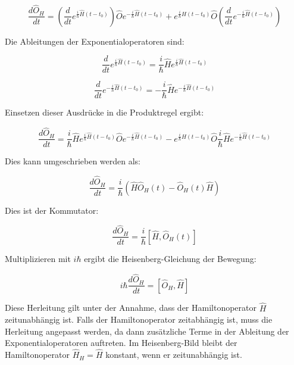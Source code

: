 \documentclass[11pt,a4paper]{article}
\begin{document}
\[
\frac{d \hat{O}_H}{d t} = \left( \frac{d}{d t} e^{\frac{i}{\hbar} \hat{H}(t-t_0)} \right) \hat{O} e^{-\frac{i}{\hbar} \hat{H}(t-t_0)} + e^{\frac{i}{\hbar} \hat{H}(t-t_0)} \hat{O} \left( \frac{d}{d t} e^{-\frac{i}{\hbar} \hat{H}(t-t_0)} \right)
\]

Die Ableitungen der Exponentialoperatoren sind:

\[
\frac{d}{d t} e^{\frac{i}{\hbar} \hat{H}(t-t_0)} = \frac{i}{\hbar} \hat{H} e^{\frac{i}{\hbar} \hat{H}(t-t_0)}
\]

\[
\frac{d}{d t} e^{-\frac{i}{\hbar} \hat{H}(t-t_0)} = -\frac{i}{\hbar} \hat{H} e^{-\frac{i}{\hbar} \hat{H}(t-t_0)}
\]

Einsetzen dieser Ausdrücke in die Produktregel ergibt:

\[
\frac{d \hat{O}_H}{d t} = \frac{i}{\hbar} \hat{H} e^{\frac{i}{\hbar} \hat{H}(t-t_0)} \hat{O} e^{-\frac{i}{\hbar} \hat{H}(t-t_0)} - e^{\frac{i}{\hbar} \hat{H}(t-t_0)} \hat{O} \frac{i}{\hbar} \hat{H} e^{-\frac{i}{\hbar} \hat{H}(t-t_0)}
\]

Dies kann umgeschrieben werden als:

\[
\frac{d \hat{O}_H}{d t} = \frac{i}{\hbar} \left( \hat{H} \hat{O}_H(t) - \hat{O}_H(t) \hat{H} \right)
\]

Dies ist der Kommutator:

\[
\frac{d \hat{O}_H}{d t} = \frac{i}{\hbar} [\hat{H}, \hat{O}_H(t)]
\]

Multiplizieren mit \(i \hbar\) ergibt die Heisenberg-Gleichung der Bewegung:

\[
i \hbar \frac{d \hat{O}_H}{d t} = [\hat{O}_H, \hat{H}]
\]

Diese Herleitung gilt unter der Annahme, dass der Hamiltonoperator \(\hat{H}\) zeitunabhängig ist. Falls der Hamiltonoperator zeitabhängig ist, muss die Herleitung angepasst werden, da dann zusätzliche Terme in der Ableitung der Exponentialoperatoren auftreten. Im Heisenberg-Bild bleibt der Hamiltonoperator \(\hat{H}_H = \hat{H}\) konstant, wenn er zeitunabhängig ist.
\end{document}
